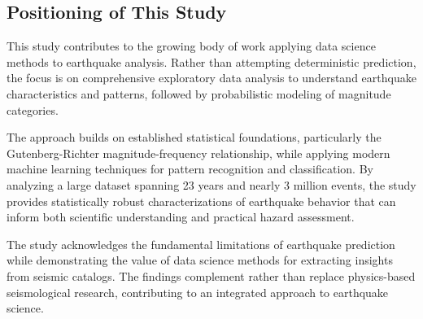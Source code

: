 \subsection{Positioning of This Study}

This study contributes to the growing body of work applying data science methods to earthquake analysis. Rather than attempting deterministic prediction, the focus is on comprehensive exploratory data analysis to understand earthquake characteristics and patterns, followed by probabilistic modeling of magnitude categories.

The approach builds on established statistical foundations, particularly the Gutenberg-Richter magnitude-frequency relationship, while applying modern machine learning techniques for pattern recognition and classification. By analyzing a large dataset spanning 23 years and nearly 3 million events, the study provides statistically robust characterizations of earthquake behavior that can inform both scientific understanding and practical hazard assessment.

The study acknowledges the fundamental limitations of earthquake prediction while demonstrating the value of data science methods for extracting insights from seismic catalogs. The findings complement rather than replace physics-based seismological research, contributing to an integrated approach to earthquake science.
